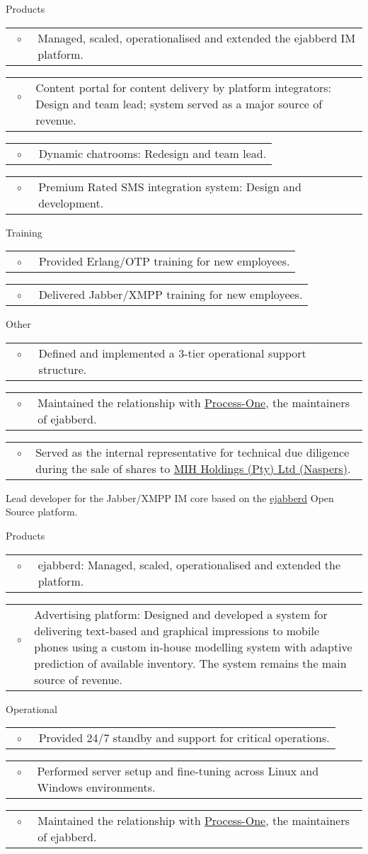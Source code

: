 \documentclass[10pt,a4paper,final]{columncv}
\makeatletter
\newcommand{\cvitembullet}[1]{%
  \begin{tabularx}{\linewidth}{@{}l@{\hspace{0.1em}}X@{}}
    ~$\circ$~ & #1 \\
  \end{tabularx}%
}
\makeatother
\begin{document}
\begin{cvenv}
         {Products
            \cvitembullet{Managed, scaled, operationalised and extended the ejabberd IM platform.}
            \cvitembullet{Content portal for content delivery by platform integrators:
             Design and team lead; system served as a major source of revenue.}
            \cvitembullet{Dynamic chatrooms: Redesign and team lead.}
            \cvitembullet{Premium Rated SMS integration system: Design and development.}
          Training
            \cvitembullet{Provided Erlang/OTP training for new employees.}
            \cvitembullet{Delivered Jabber/XMPP training for new employees.}
          Other
            \cvitembullet{Defined and implemented a 3-tier operational support structure.}
            \cvitembullet{Maintained the relationship with
             \href{http://www.process-one.net/en/}{Process-One}, the maintainers of ejabberd.}
            \cvitembullet{Served as the internal representative for technical due diligence during
             the sale of shares to \href{http://www.naspers.com/}{MIH Holdings (Pty) Ltd (Naspers)}.}
         }
\end{cvenv}

\pagebreak

\begin{cvenv}
         {Lead developer for the Jabber/XMPP IM core based on the
          \href{http://www.process-one.net/en/ejabberd/}{ejabberd} Open Source platform.}
         {Products
            \cvitembullet{ejabberd: Managed, scaled, operationalised and extended the platform.}
            \cvitembullet{Advertising platform: Designed and developed a system for delivering
                          text-based and graphical impressions to mobile phones using a custom
                          in-house modelling system with adaptive prediction of available inventory.
                          The system remains the main source of revenue.}
          Operational
            \cvitembullet{Provided 24/7 standby and support for critical operations.}
            \cvitembullet{Performed server setup and fine-tuning across Linux and Windows environments.}
            \cvitembullet{Maintained the relationship with
                          \href{http://www.process-one.net/en/}{Process-One}, the maintainers of ejabberd.}}
\end{cvenv}
\end{document}
